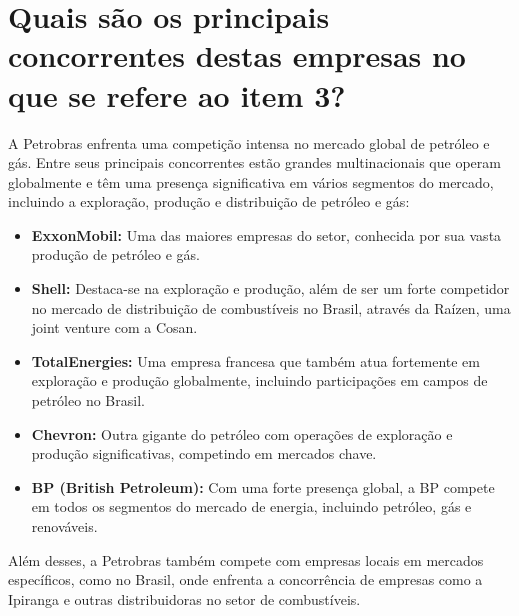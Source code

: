 \section{Quais são os principais concorrentes destas empresas no que se refere ao item 3?}

A Petrobras enfrenta uma competição intensa no mercado global de petróleo e gás. Entre seus principais concorrentes estão grandes multinacionais que operam globalmente e têm uma presença significativa em vários segmentos do mercado, incluindo a exploração, produção e distribuição de petróleo e gás:

\begin{itemize}
    \item \textbf{ExxonMobil:} Uma das maiores empresas do setor, conhecida por sua vasta produção de petróleo e gás.
    \item \textbf{Shell:} Destaca-se na exploração e produção, além de ser um forte competidor no mercado de distribuição de combustíveis no Brasil, através da Raízen, uma joint venture com a Cosan.
    \item \textbf{TotalEnergies:} Uma empresa francesa que também atua fortemente em exploração e produção globalmente, incluindo participações em campos de petróleo no Brasil.
    \item \textbf{Chevron:} Outra gigante do petróleo com operações de exploração e produção significativas, competindo em mercados chave.
    \item \textbf{BP (British Petroleum):} Com uma forte presença global, a BP compete em todos os segmentos do mercado de energia, incluindo petróleo, gás e renováveis.
\end{itemize}

Além desses, a Petrobras também compete com empresas locais em mercados específicos, como no Brasil, onde enfrenta a concorrência de empresas como a Ipiranga e outras distribuidoras no setor de combustíveis.